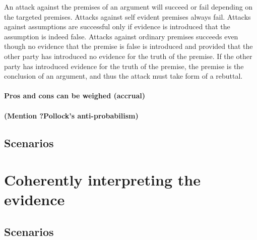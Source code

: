 \documentclass[10pt]{article}
\begin{document}
An attack against the premises of an argument will succeed or fail depending on the targeted premises. Attacks against self evident premises always fail. Attacks against assumptions are successful only if evidence is introduced that the assumption is indeed false. Attacks against ordinary premises succeeds even though no evidence that the premise is false is introduced and provided that the other party has introduced no evidence for the truth of the premise. If the other party has introduced evidence for the truth of the premise, the premise is the conclusion of an argument, and thus the attack must take form of a rebuttal.







 





 

 


\paragraph{Pros and cons can be weighed (accrual)}

\paragraph{(Mention ?Pollock's anti-probabilism)}

\subsection{Scenarios}


\section{Coherently interpreting the evidence}
\label{sec:cohint}

\subsection{Scenarios}
\end{document}
